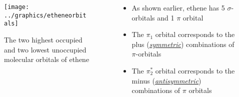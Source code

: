 \documentclass[a4paper,12pt,titlepage]{article}
\begin{document}
\begin{frame}
 {
\begin{columns}[onlytextwidth]
\begin{column}{.4\textwidth}
\begin{figure}[t]
\texttt{[image: ../graphics/etheneorbitals]}
\caption{The two highest occupied and two lowest unoccupied molecular orbitals of ethene}
\end{figure}
\end{column}
\begin{column}{.6\textwidth}
\begin{itemize}
\item As shown earlier, ethene has 5 \(\sigma\)-orbitals and 1 \(\pi\) orbital
\item The \(\pi_1\) orbital corresponds to the plus (\emph{\underline{symmetric}}) combinations of \(\pi\)-orbitals
\item The \(\pi_2^*\) orbital corresponds to the minus (\emph{\underline{antisymmetric}}) combinations of \(\pi\) orbitals
\end{itemize}
\end{column}
\end{columns} 
}
\end{frame}
\end{document}
